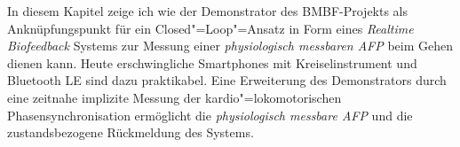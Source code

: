 \label{sec:zusammenfassung_6}

In diesem Kapitel zeige ich wie der Demonstrator des \acs{BMBF}-Projekts als Anknüpfungspunkt für ein Closed"=Loop"=Ansatz in Form eines \emph{Realtime Biofeedback} Systems zur Messung einer \emph{physiologisch messbaren \ac{AFP}} beim Gehen dienen kann. Heute erschwingliche Smartphones mit Kreiselinstrument und Bluetooth LE sind dazu praktikabel. Eine Erweiterung des Demonstrators durch eine zeitnahe implizite Messung der kardio"=lokomotorischen Phasensynchronisation ermöglicht die \emph{physiologisch messbare \ac{AFP}} und die zustandsbezogene Rückmeldung des Systems.


